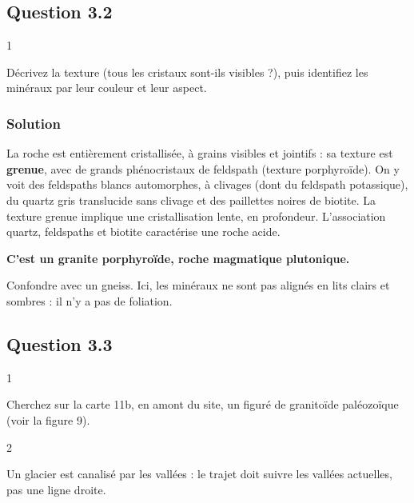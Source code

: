 \documentclass[11pt,a4paper]{article}
\begin{document}
\hypertarget{question-3.2}{%
\subsection{Question 3.2}\label{question-3.2}}

\begin{indication}{1}

Décrivez la texture (tous les cristaux sont-ils visibles ?), puis identifiez les minéraux par leur couleur et leur aspect.

\end{indication}

\hypertarget{solution-29}{%
\subsubsection{Solution}\label{solution-29}}

La roche est entièrement cristallisée, à grains visibles et jointifs : sa texture est \textbf{grenue}, avec de grands phénocristaux de feldspath (texture porphyroïde). On y voit des feldspaths blancs automorphes, à clivages (dont du feldspath potassique), du quartz gris translucide sans clivage et des paillettes noires de biotite. La texture grenue implique une cristallisation lente, en profondeur. L'association quartz, feldspaths et biotite caractérise une roche acide.

\textbf{C'est un granite porphyroïde, roche magmatique plutonique.}

\begin{piege}

Confondre avec un gneiss. Ici, les minéraux ne sont pas alignés en lits clairs et sombres : il n'y a pas de foliation.

\end{piege}

\hypertarget{question-3.3}{%
\subsection{Question 3.3}\label{question-3.3}}

\begin{indication}{1}

Cherchez sur la carte 11b, en amont du site, un figuré de granitoïde paléozoïque (voir la figure 9).

\end{indication}

\begin{indication}{2}

Un glacier est canalisé par les vallées : le trajet doit suivre les vallées actuelles, pas une ligne droite.

\end{indication}
\end{document}
